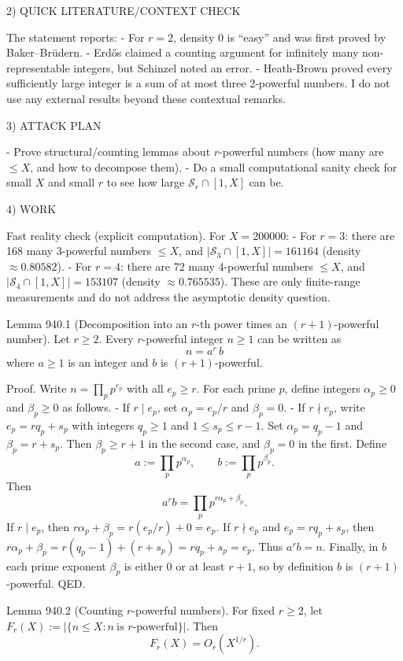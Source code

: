 2) QUICK LITERATURE/CONTEXT CHECK

The statement reports:
- For \(r=2\), density 0 is ``easy'' and was first proved by Baker--Br\"{u}dern.
- Erd\H{o}s claimed a counting argument for infinitely many non-representable integers, but Schinzel noted an error.
- Heath-Brown proved every sufficiently large integer is a sum of at most three 2-powerful numbers.
I do not use any external results beyond these contextual remarks.

3) ATTACK PLAN

- Prove structural/counting lemmas about \(r\)-powerful numbers (how many are \(\le X\), and how to decompose them).
- Do a small computational sanity check for small \(X\) and small \(r\) to see how large \(\mathcal S_r\cap[1,X]\) can be.

4) WORK

Fast reality check (explicit computation).
For \(X=200000\):
- For \(r=3\): there are 168 many 3-powerful numbers \(\le X\), and \(|\mathcal S_3\cap[1,X]|=161164\) (density \(\approx 0.80582\)).
- For \(r=4\): there are 72 many 4-powerful numbers \(\le X\), and \(|\mathcal S_4\cap[1,X]|=153107\) (density \(\approx 0.765535\)).
These are only finite-range measurements and do not address the asymptotic density question.

Lemma 940.1 (Decomposition into an \(r\)-th power times an \((r+1)\)-powerful number).
Let \(r\ge 2\). Every \(r\)-powerful integer \(n\ge 1\) can be written as
\[n=a^r\,b\]
where \(a\ge 1\) is an integer and \(b\) is \((r+1)\)-powerful.

Proof.
Write \(n=\prod_p p^{e_p}\) with all \(e_p\ge r\).
For each prime \(p\), define integers \(\alpha_p\ge 0\) and \(\beta_p\ge 0\) as follows.
- If \(r\mid e_p\), set \(\alpha_p=e_p/r\) and \(\beta_p=0\).
- If \(r\nmid e_p\), write \(e_p=rq_p+s_p\) with integers \(q_p\ge 1\) and \(1\le s_p\le r-1\). Set \(\alpha_p=q_p-1\) and \(\beta_p=r+s_p\).
Then \(\beta_p\ge r+1\) in the second case, and \(\beta_p=0\) in the first.
Define
\[a:=\prod_p p^{\alpha_p},\qquad b:=\prod_p p^{\beta_p}.
\]
Then
\[a^r b = \prod_p p^{r\alpha_p+\beta_p}.
\]
If \(r\mid e_p\), then \(r\alpha_p+\beta_p=r(e_p/r)+0=e_p\). If \(r\nmid e_p\) and \(e_p=rq_p+s_p\), then
\(r\alpha_p+\beta_p=r(q_p-1)+(r+s_p)=rq_p+s_p=e_p\).
Thus \(a^r b=n\).
Finally, in \(b\) each prime exponent \(\beta_p\) is either 0 or at least \(r+1\), so by definition \(b\) is \((r+1)\)-powerful.
QED.

Lemma 940.2 (Counting \(r\)-powerful numbers).
For fixed \(r\ge 2\), let \(F_r(X):=|\{n\le X: n\ \text{is $r$-powerful}\}|\). Then
\[F_r(X)=O_r(X^{1/r}).\]

